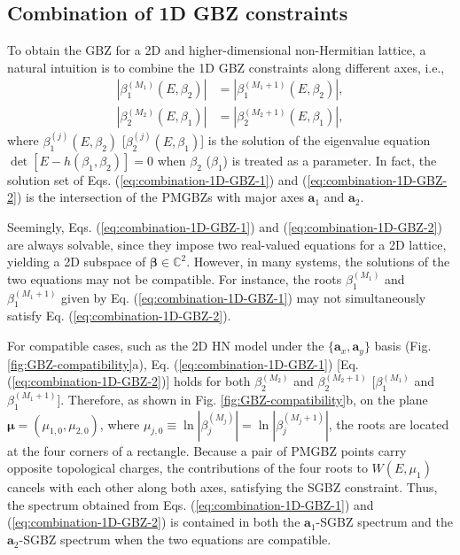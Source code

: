 \documentclass[pdflatex,sn-nature, iicol]{sn-jnl}%
\theoremstyle{thmstyleone}%
\theoremstyle{thmstyletwo}%
\theoremstyle{thmstylethree}%
\begin{document}
\subsection{Combination of 1D GBZ constraints}

To obtain the GBZ for a 2D and higher-dimensional non-Hermitian lattice,
a natural intuition is to combine the 1D GBZ constraints along different
axes, i.e., 
\begin{align}
\left|\beta_{1}^{(M_{1})}\left(E,\beta_{2}\right)\right| & =\left|\beta_{1}^{(M_{1}+1)}\left(E,\beta_{2}\right)\right|,\label{eq:combination-1D-GBZ-1}\\
\left|\beta_{2}^{(M_{2})}\left(E,\beta_{1}\right)\right| & =\left|\beta_{2}^{(M_{2}+1)}\left(E,\beta_{1}\right)\right|,\label{eq:combination-1D-GBZ-2}
\end{align}
where $\beta_{1}^{(j)}(E,\beta_{2})$ {[}$\beta_{2}^{(j)}(E,\beta_{1})${]}
is the solution of the eigenvalue equation $\det[E-h(\beta_{1},\beta_{2})]=0$
when $\beta_{2}$ ($\beta_{1}$) is treated as a parameter. In fact,
the solution set of Eqs. (\ref{eq:combination-1D-GBZ-1}) and (\ref{eq:combination-1D-GBZ-2})
is the intersection of the PMGBZs with major axes $\mathbf{a}_{1}$
and $\mathbf{a}_{2}$.

Seemingly, Eqs. (\ref{eq:combination-1D-GBZ-1}) and (\ref{eq:combination-1D-GBZ-2})
are always solvable, since they impose two real-valued equations for
a 2D lattice, yielding a 2D subspace of $\boldsymbol{\beta}\in\mathbb{C}^{2}$.
However, in many systems, the solutions of the two equations may not
be compatible. For instance, the roots $\beta_{1}^{(M_{1})}$ and
$\beta_{1}^{(M_{1}+1)}$ given by Eq. (\ref{eq:combination-1D-GBZ-1})
may not simultaneously satisfy Eq. (\ref{eq:combination-1D-GBZ-2}).

For compatible cases, such as the 2D HN model under the $\{\mathbf{a}_{x},\mathbf{a}_{y}\}$
basis (Fig. \ref{fig:GBZ-compatibility}a), Eq. (\ref{eq:combination-1D-GBZ-1})
{[}Eq. (\ref{eq:combination-1D-GBZ-2}){]} holds for both $\beta_{2}^{(M_{2})}$
and $\beta_{2}^{(M_{2}+1)}$ {[}$\beta_{1}^{(M_{1})}$ and $\beta_{1}^{(M_{1}+1)}${]}.
Therefore, as shown in Fig. \ref{fig:GBZ-compatibility}b, on the
plane $\boldsymbol{\mu}=(\mu_{1,0},\mu_{2,0})$, where $\mu_{j,0}\equiv\ln|\beta_{j}^{(M_{j})}|=\ln|\beta_{j}^{(M_{j}+1)}|$,
the roots are located at the four corners of a rectangle. Because
a pair of PMGBZ points carry opposite topological charges, the contributions
of the four roots to $W(E, \mu_1)$ cancels with each other
along both axes, satisfying the SGBZ constraint. Thus, the spectrum
obtained from Eqs. (\ref{eq:combination-1D-GBZ-1}) and (\ref{eq:combination-1D-GBZ-2})
is contained in both the $\mathbf{a}_{1}$-SGBZ spectrum and the $\mathbf{a}_{2}$-SGBZ
spectrum when the two equations are compatible.
\end{document}
